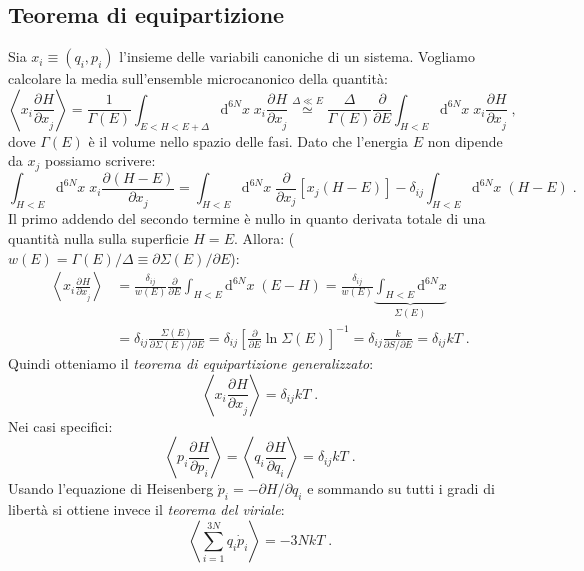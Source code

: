 \documentclass[10pt,a4paper]{report}
\theoremstyle{definition}
\newcommand{\pdev}[3][]{\frac{\partial^{#1} #2}{\partial #3^{#1}}}
\numberwithin{equation}{section}
\newcommand{\diff}[1][]{\mathrm{d}#1}
\begin{document}
\subsection{Teorema di equipartizione}
Sia $x_i\equiv (q_i,p_i)$ l'insieme delle variabili canoniche di un sistema. Vogliamo calcolare la media sull'ensemble microcanonico della quantità:
\begin{equation}
\left\langle x_i\pdev{H}{x_j}\right\rangle =\frac{1}{\Gamma(E)}\int_{E<H<E+\Delta} \diff^{6N}{x}\;x_i\pdev{H}{x_j}\stackrel{\Delta\ll E}{\simeq} \frac{\Delta}{\Gamma(E)}\frac{\partial}{\partial E}\int_{H<E}\diff^{6N}x\; x_i\pdev{H}{x_j}\;,
\end{equation}
dove $\Gamma(E)$ è il volume nello spazio delle fasi. Dato che l'energia $E$ non dipende da $x_j$ possiamo scrivere:
\begin{equation*}
\int_{H<E}\diff^{6N}{x}\;x_i\pdev{(H-E)}{x_j}=\int_{H<E}\diff^{6N}{x}\;\frac{\partial}{\partial x_j}[x_j(H-E)]-\delta_{ij}\int_{H<E}\diff^{6N}{x}\;(H-E)\;.
\end{equation*}
Il primo addendo del secondo termine è nullo in quanto derivata totale di una quantità nulla sulla superficie $H=E$. Allora: ($w(E)=\Gamma(E)/\Delta\equiv\partial\Sigma(E)/\partial E$):
\begin{align*}
\left\langle x_i\pdev{H}{x_j}\right\rangle &= \frac{\delta_{ij}}{w(E)}\frac{\partial}{\partial E}\int_{H<E}\diff^{6N}{x}\;(E-H)=\frac{\delta_{ij}}{w(E)}\underbrace{\int_{H<E}\diff^{6N}{x}}_{\Sigma(E)}  \\
&= \delta_{ij}\frac{\Sigma(E)}{\partial\Sigma(E)/\partial E}=\delta_{ij}\left[\frac{\partial}{\partial E}\ln\Sigma(E)\right]^{-1}=\delta_{ij}\frac{k}{\partial S/\partial E}=\delta_{ij}kT\;.
\end{align*}
Quindi otteniamo il \emph{teorema di equipartizione generalizzato}:
\begin{equation}
\left\langle x_i\pdev{H}{x_j}\right\rangle = \delta_{ij}kT\;.
\end{equation}
Nei casi specifici:
\begin{equation}
\left\langle p_i\pdev{H}{p_i}\right\rangle=\left\langle q_i\pdev{H}{q_i}\right\rangle = \delta_{ij}kT\;.
\end{equation}
Usando l'equazione di Heisenberg $\dot{p}_i=-\partial H/\partial q_i$ e sommando su tutti i gradi di libertà si ottiene invece il \emph{teorema del viriale}:
\begin{equation}
\left\langle \sum_{i=1}^{3N} q_i\dot{p}_i\right\rangle = -3NkT\;.
\end{equation}
\end{document}
